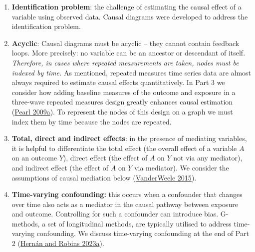\documentclass[
  singlecolumn]{article}
\begin{document}
\begin{enumerate}
\def\labelenumi{\arabic{enumi}.}
\setcounter{enumi}{12}
\item
  \textbf{Identification problem}: the challenge of estimating the
  causal effect of a variable using observed data. Causal diagrams were
  developed to address the identification problem.
\item
  \textbf{Acyclic}: Causal diagrams must be acyclic -- they cannot
  contain feedback loops. More precisely: no variable can be an ancestor
  or descendant of itself. \emph{Therefore, in cases where repeated
  measurements are taken, nodes must be indexed by time.} As mentioned,
  repeated measures time series data are almost always required to
  estimate causal effects quantitatively. In Part 3 we consider how
  adding baseline measures of the outcome and exposure in a three-wave
  repeated measures design greatly enhances causal estimation
  (\protect\hyperlink{ref-pearl2009}{Pearl 2009a}). To represent the
  nodes of this design on a graph we must index them by time because the
  nodes are repeated.
\item
  \textbf{Total, direct and indirect effects}: in the presence of
  mediating variables, it is helpful to differentiate the total effect
  (the overall effect of a variable \(A\) on an outcome \(Y\)), direct
  effect (the effect of \(A\) on \(Y\) not via any mediator), and
  indirect effect (the effect of \(A\) on \(Y\) via mediator). We
  consider the assumptions of causal mediation below
  (\protect\hyperlink{ref-vanderweele2015}{VanderWeele 2015}).
\item
  \textbf{Time-varying confounding:} this occurs when a confounder that
  changes over time also acts as a mediator in the causal pathway
  between exposure and outcome. Controlling for such a confounder can
  introduce bias. G-methods, a set of longitudinal methods, are
  typically utilised to address time-varying confounding. We discuss
  time-varying confounding at the end of Part 2
  (\protect\hyperlink{ref-hernuxe1n2023}{Hernán and Robins 2023a}).
\end{enumerate}
\end{document}
